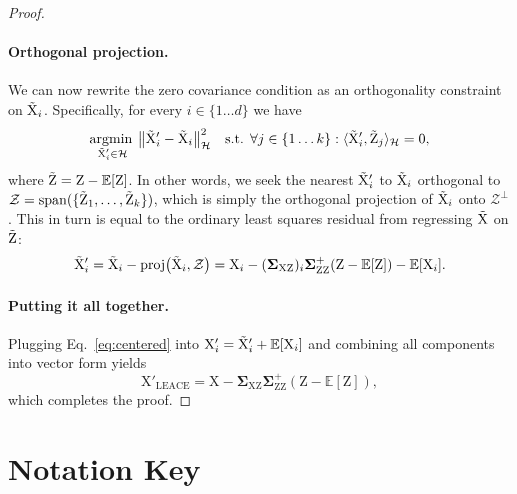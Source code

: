 \documentclass{article}
\theoremstyle{plain}
\theoremstyle{remark}
\newcommand{\sxz}{\mathbf \Sigma_{\rv X \rv Z}}
\newcommand{\szz}{\mathbf \Sigma_{\rv Z \rv Z}}
\newcommand{\E}{\mathbb E}
\theoremstyle{plain}
\theoremstyle{TheoremNum}
\newcommand{\rv}[1]{{\mathrm{#1}}}
\begin{document}
\begin{proof}
    \paragraph{Orthogonal projection.} We can now rewrite the zero covariance condition as an orthogonality constraint on $\Tilde{\rv X}_i$. Specifically, for every $i \in \{1\ldots d\}$ we have
\begin{equation}\label{eq:dual-problem}
    \mathop{\mathrm{argmin\:}}_{\substack{\Tilde{\rv X}_i' \in \mathcal H}} \big \| \Tilde{\rv X}_i' - \Tilde{\rv X}_i \big \|^2_{\mathcal H} \quad \mathrm{s.t.}\:\: \forall j \in \{1\ldots k\} : \langle \Tilde{\rv X}_i', \Tilde{\rv Z}_j \rangle_{\mathcal H} = 0,
    \end{equation}
    where $\Tilde{\rv Z} = \rv Z - \E[\rv Z]$. In other words, we seek the nearest $\Tilde{\rv X}_i'$ to $\Tilde{\rv X}_i$ orthogonal to $\mathcal Z = \mathrm{span}(\{ \Tilde{\rv Z}_1, \ldots, \Tilde{\rv Z}_k \})$, which is simply the orthogonal projection of $\Tilde{\rv X}_i$ onto $\mathcal Z^\perp$. This in turn is equal to the ordinary least squares residual from regressing $\Tilde{\rv X}$ on $\Tilde{\rv Z}$:
\begin{equation}\label{eq:centered}
        \Tilde{\rv X}_i' = \Tilde{\rv X}_i - \mathrm{proj} \big(\Tilde{\rv X}_i, \mathcal Z \big) = \rv X_i - (\sxz)_i \szz^+ (\rv Z - \E[\rv Z]) - \E[\rv X_i].
    \end{equation}
    \paragraph{Putting it all together.} Plugging Eq.~\ref{eq:centered} into $\rv X_i' = \Tilde{\rv X}_i' + \E[\rv X_i]$ and combining all components into vector form yields
    \begin{equation}
        \rv X'_{\mathrm{LEACE}} = \rv X - \sxz \szz^+ (\rv Z - \E[\rv Z]),
    \end{equation}
    which completes the proof.
\end{proof}

\section{Notation Key}
\end{document}
